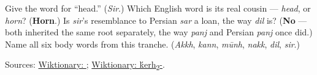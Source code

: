 \begin{tcolorbox}[breakable,colback=teal!4,colframe=teal!35!black,title={Before you move on}]
Give the word for \textquotedblleft{}head.\textquotedblright{} (\emph{Sir}.) Which English word is its real cousin — \emph{head}, or \emph{horn}? (\textbf{Horn}.) Is \emph{sir}'s resemblance to Persian \emph{sar} a loan, the way \emph{dil} is? (\textbf{No} — both inherited the same root separately, the way \emph{panj} and Persian \emph{panj} once did.) Name all six body words from this tranche. (\emph{Akkh}, \emph{kann}, \emph{mūnh}, \emph{nakk}, \emph{dil}, \emph{sir}.)

Sources: \href{https://en.wiktionary.org/wiki/\%E0\%A8\%B8\%E0\%A8\%BF\%E0\%A8\%B0}{Wiktionary: }; \href{https://en.wiktionary.org/wiki/Reconstruction:Proto-Indo-European/\%E1\%B8\%B1erh\%E2\%82\%82-}{Wiktionary: \'{k}erh\textsubscript{2}-}.
\end{tcolorbox}
